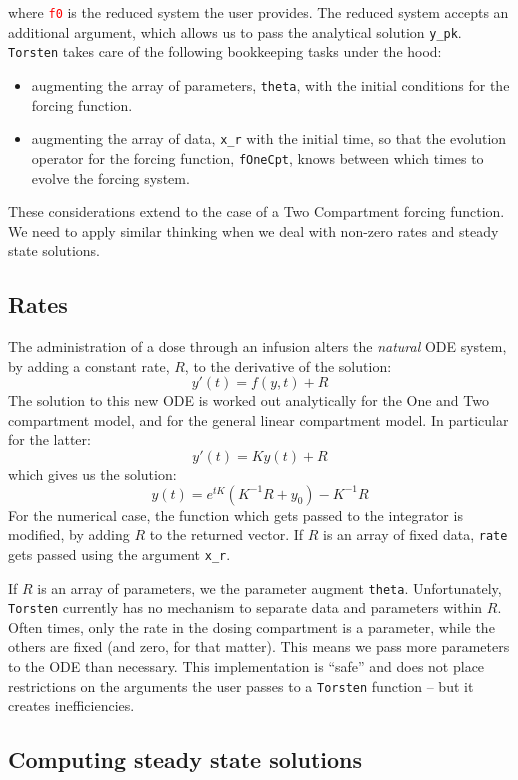\documentclass[11pt]{article}
\begin{document}
%
where \texttt{\textcolor{red}{f0}} is the reduced system the user provides. The reduced 
system accepts an additional argument, which allows us to pass the analytical solution \texttt{y\_pk}. 
\texttt{Torsten} takes care of the following bookkeeping tasks under the hood:
\begin{itemize}
  \item augmenting the array of parameters, \texttt{theta}, with the initial conditions for the forcing function.
  \item augmenting the array of data, \texttt{x\_r} with the initial time, so that the evolution operator
  for the forcing function, \texttt{fOneCpt}, knows between which times to evolve the forcing system.
\end{itemize}
%
These considerations extend to the case of a Two Compartment forcing function. We need to apply 
similar thinking when we deal with non-zero rates and steady state solutions.

\subsection{Rates}

The administration of a dose through an infusion alters the \textit{natural} ODE system, by 
adding a constant rate, $R$, to the derivative of the solution:
%
$$
y'(t) = f(y, t) + R
$$
%
The solution to this new ODE is worked out analytically for the One and Two compartment 
model, and for the general linear compartment model. In particular for the latter:
%
$$
y'(t) = K y(t) + R
$$
%
which gives us the solution:
%
$$
y(t) = e^{tK} (K^{-1}R + y_0) - K^{-1} R
$$ 
%
For the numerical case, the function which gets passed to the integrator is modified, by adding
 $R$ to the returned vector. If $R$ is an array of fixed data, \texttt{rate} gets passed using the argument
 \texttt{x\_r}.

If $R$ is an array of parameters, we the parameter augment \texttt{theta}. Unfortunately, \texttt{Torsten} currently has 
no mechanism to separate data and parameters within $R$. Often times, only the rate in the dosing
compartment is a parameter, while the others are fixed (and zero, for that matter). This means we 
pass more parameters to the ODE  than necessary. This implementation is ``safe'' and does not place
restrictions on the arguments the user passes to a \texttt{Torsten} function -- but it creates inefficiencies.

\subsection{Computing steady state solutions}
\end{document}
